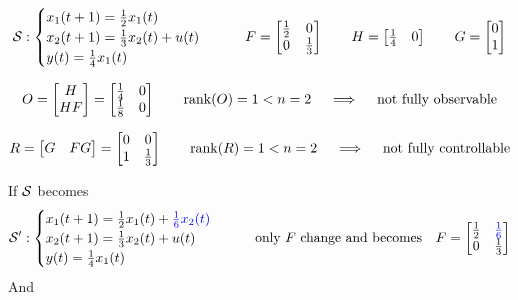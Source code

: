 \begin{example}[SISO system of order $n=2$]
    \begin{align*}
    \mathcal{S}: 
        \begin{cases}
            x_1(t+1) = \frac{1}{2} x_1(t)\\
            x_2(t+1) = \frac{1}{3}x_2(t) + u(t)\\
            y(t) = \frac{1}{4}x_1(t)
        \end{cases}
        \qquad
        F = \begin{bmatrix}
            \frac{1}{2} & 0\\
            0 & \frac{1}{3}
        \end{bmatrix}
        \qquad
        H = \begin{bmatrix}
            \frac{1}{4} & 0
        \end{bmatrix}
        \qquad
        G = \begin{bmatrix}
            0 \\
            1
        \end{bmatrix}
    \end{align*}

    \[
        O = \begin{bmatrix}
            H \\
            HF
        \end{bmatrix} = \begin{bmatrix}
            \frac{1}{4} & 0 \\
            \frac{1}{8} & 0
        \end{bmatrix}
        \qquad
        \operatorname*{rank} (O) = 1 < n = 2
        \quad\implies\quad \text{not fully observable}
    \]

    \[
        R = \begin{bmatrix}
            G & FG
        \end{bmatrix} = \begin{bmatrix}
            0 & 0 \\
            1 & \frac{1}{3}
        \end{bmatrix}
        \qquad
        \operatorname*{rank} (R) = 1 < n = 2
        \quad\implies\quad \text{not fully controllable}
    \]
    
    If $\mathcal{S}$ becomes 
    \begin{align*}
    \mathcal{S'}: 
        \begin{cases}
            x_1(t+1) = \frac{1}{2} x_1(t) + \color{blue} \frac{1}{6} x_2(t)\\
            x_2(t+1) = \frac{1}{3}x_2(t) + u(t)\\
            y(t) = \frac{1}{4}x_1(t)
        \end{cases}
        \qquad
        \text{only $F$ change and becomes}\quad
        F = \begin{bmatrix}
            \frac{1}{2} & \color{blue} \frac{1}{6} \\
            0 & \frac{1}{3}
        \end{bmatrix}
    \end{align*} 
    And  
    

\end{example}
